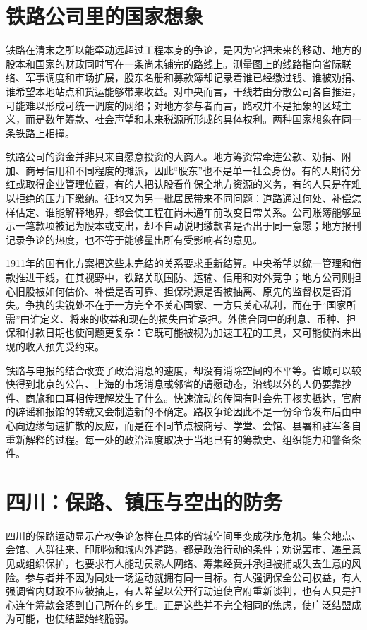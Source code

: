 \section{铁路公司里的国家想象}

铁路在清末之所以能牵动远超过工程本身的争论，是因为它把未来的移动、地方的股本和国家的财政同时写在一条尚未铺完的路线上。测量图上的线路指向省际联络、军事调度和市场扩展，股东名册和募款簿却记录着谁已经缴过钱、谁被劝捐、谁希望本地站点和货运能够带来收益。对中央而言，干线若由分散公司各自推进，可能难以形成可统一调度的网络；对地方参与者而言，路权并不是抽象的区域主义，而是数年筹款、社会声望和未来税源所形成的具体权利。两种国家想象在同一条铁路上相撞。

铁路公司的资金并非只来自愿意投资的大商人。地方筹资常牵连公款、劝捐、附加、商号信用和不同程度的摊派，因此“股东”也不是单一社会身份。有的人期待分红或取得企业管理位置，有的人把认股看作保全地方资源的义务，有的人只是在难以拒绝的压力下缴纳。征地又为另一批居民带来不同问题：道路通过何处、补偿怎样估定、谁能解释地界，都会使工程在尚未通车前改变日常关系。公司账簿能够显示一笔款项被记为股本或支出，却不自动说明缴款者是否出于同一意愿；地方报刊记录争论的热度，也不等于能够量出所有受影响者的意见。

1911年的国有化方案把这些未完结的关系要求重新结算。中央希望以统一管理和借款推进干线，在其视野中，铁路关联国防、运输、信用和对外竞争；地方公司则担心旧股被如何估价、补偿是否可靠、担保税源是否被抽离、原先的监督权是否消失。争执的尖锐处不在于一方完全不关心国家、一方只关心私利，而在于“国家所需”由谁定义、将来的收益和现在的损失由谁承担。外债合同中的利息、币种、担保和付款日期也使问题更复杂：它既可能被视为加速工程的工具，又可能使尚未出现的收入预先受约束。

铁路与电报的结合改变了政治消息的速度，却没有消除空间的不平等。省城可以较快得到北京的公告、上海的市场消息或邻省的请愿动态，沿线以外的人仍要靠抄件、商旅和口耳相传理解发生了什么。快速流动的传闻有时会先于核实抵达，官府的辟谣和报馆的转载又会制造新的不确定。路权争论因此不是一份命令发布后由中心向边缘匀速扩散的反应，而是在不同节点被商号、学堂、会馆、县署和驻军各自重新解释的过程。每一处的政治温度取决于当地已有的筹款史、组织能力和警备条件。

\section{四川：保路、镇压与空出的防务}

四川的保路运动显示产权争论怎样在具体的省城空间里变成秩序危机。集会地点、会馆、人群往来、印刷物和城内外道路，都是政治行动的条件；劝说罢市、递呈意见或组织保护，也要求有人能动员熟人网络、筹集经费并承担被捕或失去生意的风险。参与者并不因为同处一场运动就拥有同一目标。有人强调保全公司权益，有人强调省内财政不应被抽走，有人希望以公开行动迫使官府重新谈判，也有人只是担心连年筹款会落到自己所在的乡里。正是这些并不完全相同的焦虑，使广泛结盟成为可能，也使结盟始终脆弱。

